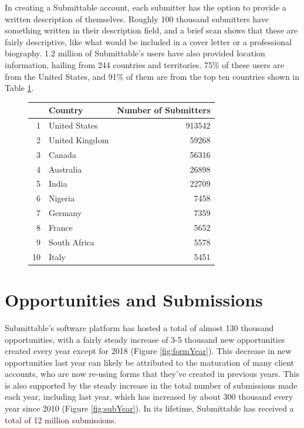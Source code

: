 \documentclass[]{report}   %
\begin{document}
\FloatBarrier
In creating a Submittable account, each submitter has the option to provide a written description of themselves. Roughly 100 thousand submitters have something written in their description field, and a brief scan shows that these are fairly descriptive, like what would be included in a cover letter or a professional biography. 1.2 million of Submittable's users have also provided location information, hailing from 244 countries and territories. 75\% of these users are from the United States, and 91\% of them are from the top ten countries shown in Table \ref{table:userCountry}. 

\begin{figure}[h]
\centering
\begin{minipage}{0.45\textwidth}
	\captionsetup{font=scriptsize}
     \centering
{}
\label{table:userCountry}
\begin{tabular}{rlr}
  \hline
 & Country & Number of Submitters \\ 
  \hline
1 & United States & 913542 \\ 
  2 & United Kingdom & 59268 \\ 
  3 & Canada & 56316 \\ 
  4 & Australia & 26898 \\ 
  5 & India & 22709 \\ 
  6 & Nigeria & 7458 \\ 
  7 & Germany & 7359 \\ 
  8 & France & 5652 \\ 
  9 & South Africa & 5578 \\ 
  10 & Italy & 5451 \\ 
   \hline
\end{tabular}
    \end{minipage}
\end{figure}
\FloatBarrier

\section{Opportunities and Submissions}
Submittable's software platform has hosted a total of almost 130 thousand opportunities, with a fairly steady increase of 3-5 thousand new opportunities created every year except for 2018 (Figure \ref{fig:formYear}). This decrease in new opportunities last year can likely be attributed to the maturation of many client accounts, who are now re-using forms that they've created in previous years. This is also supported by the steady increase in the total number of submissions made each year, including last year, which has increased by about 300 thousand every year since 2010 (Figure \ref{fig:subYear}). In its lifetime, Submittable has received a total of 12 million submissions.
\end{document}
